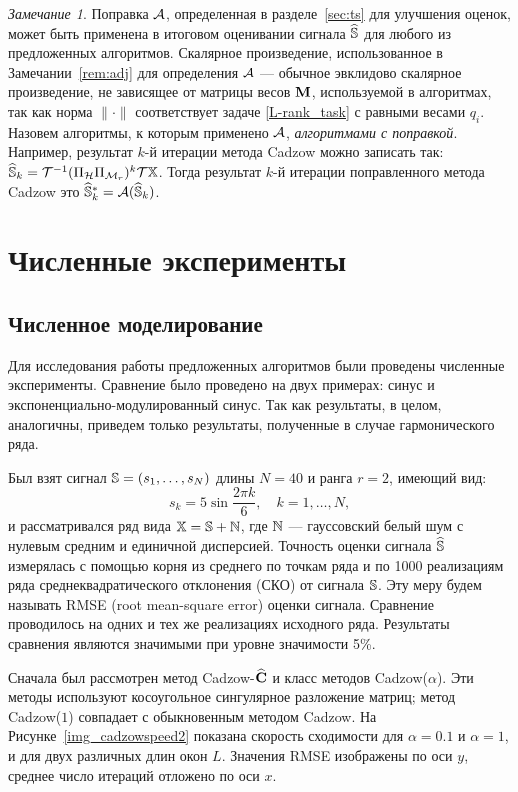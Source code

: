 \documentclass[12pt, specialist, subf,href,colorlinks=true,substylefile = spbu.rtx]{disser}
\theoremstyle{remark}
\newtheorem{remark}{Замечание}
\theoremstyle{definition}
\begin{document}
	\begin{remark}
		\label{rem:adjust}
		 Поправка $\mathcal{A}$, определенная в разделе~\ref{sec:ts} для улучшения оценок, может быть применена в итоговом оценивании сигнала $\widehat{\mathbb{S}}$ для любого из предложенных алгоритмов. Скалярное произведение, использованное в Замечании~\ref{rem:adj} для определения $\mathcal{A}$ --- обычное эвклидово скалярное произведение, не зависящее от матрицы весов $\mathbf{M}$, используемой в алгоритмах, так как норма $\|\cdot\|$ соответствует задаче \eqref{L-rank_task} с равными весами $q_i$. Назовем алгоритмы, к которым применено $\mathcal{A}$, \emph{алгоритмами с поправкой}. Например, результат $k$-й итерации метода Cadzow можно записать так: $\widehat{\mathbb{S}}_k = \mathcal{T}^{-1}(\Pi_{\mathcal{H}} \Pi_{\mathcal{M}_r})^k \mathcal{T} \mathbb{X}$. Тогда результат $k$-й итерации поправленного метода Cadzow это $\widehat{\mathbb{S}}_k^*=\mathcal{A}(\widehat{\mathbb{S}}_k)$.
	\end{remark}

\chapter{Численные эксперименты}
\label{chapter:simul}
\section{Численное моделирование}
\label{sec:simul}
Для исследования работы предложенных алгоритмов были проведены численные эксперименты. Сравнение было проведено на двух примерах: синус и экспоненциально-модулированный синус. Так как результаты, в целом, аналогичны, приведем только результаты, полученные в случае гармонического ряда.

Был взят сигнал $\mathbb{S} = (s_{1}, \ldots, s_N)$ длины $N = 40$ и ранга $r=2$, имеющий вид:
\begin{equation}
\label{eq:signal}
s_{k} = 5\sin{\frac{2 \pi k}{6}}, \quad k = 1, \ldots, N,
\end{equation}
и рассматривался ряд вида $\mathbb{X} = \mathbb{S} + \mathbb{N}$, где $\mathbb{N}$ --- гауссовский белый шум с нулевым средним и единичной дисперсией. Точность оценки сигнала $\widehat{\mathbb{S}}$ измерялась с помощью корня из среднего по точкам ряда и по 1000 реализациям ряда среднеквадратического отклонения (СКО) от сигнала $\mathbb{S}$. Эту меру будем называть RMSE (root mean-square error) оценки сигнала. Сравнение проводилось на одних и тех же реализациях исходного ряда. Результаты сравнения являются значимыми при уровне значимости 5\%.

Сначала был рассмотрен метод Cadzow-$\widehat{\mathbf{C}}$ и класс методов Cadzow($\alpha$). Эти методы используют косоугольное сингулярное разложение матриц; метод Cadzow($1$) совпадает с обыкновенным методом Cadzow. На Рисунке~\ref{img_cadzowspeed2} показана скорость сходимости для $\alpha = 0.1$ и $\alpha = 1$, и для двух различных длин окон $L$. Значения RMSE изображены по оси $y$, среднее число итераций отложено по оси $x$.
\end{document}
